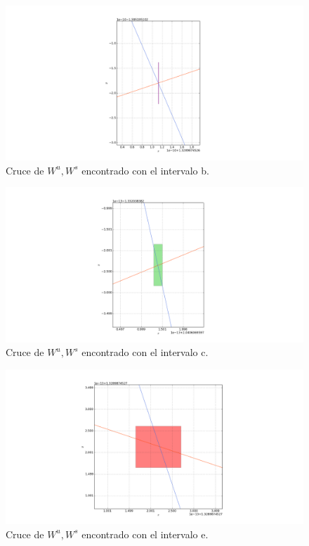 \begin{figure}[H]
\centering
\includegraphics[scale=0.4]{cruce2}
\caption{Cruce de $W^{u},W^{s}$ encontrado con el intervalo b.}
\label{cruce2H}
\end{figure}


\begin{figure}[H]
\centering
\includegraphics[scale=0.4]{cruce3}
\caption{Cruce de $W^{u},W^{s}$ encontrado con el intervalo c.}
\label{cruce3H}
\end{figure}


\begin{figure}[H]
\centering
\includegraphics[scale=0.4]{cruce5}
\caption{Cruce de $W^{u},W^{s}$ encontrado con el intervalo e.}
\label{cruce5H}
\end{figure}

